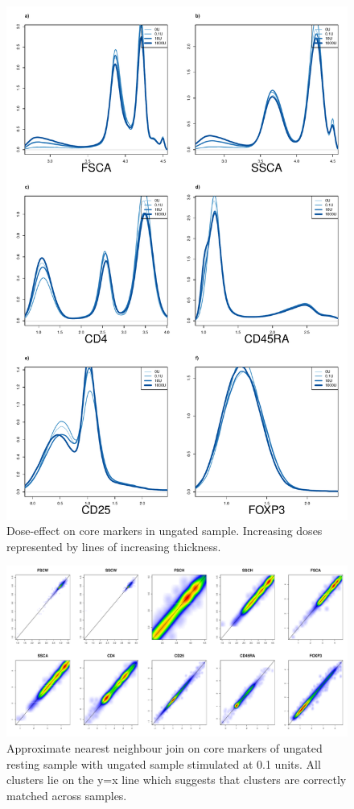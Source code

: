 \hspace{-2cm}
\begin{figure}[h]
\centering
\includegraphics[scale=.3]{IL2/figures/dose-effect.pdf}
{Dose-effect on core markers in ungated sample.}
{
Increasing doses represented by lines of increasing thickness.
}
\end{figure}

\hspace{-2cm}
\begin{figure}[h]
\centering
\includegraphics[scale=.3]{IL2/figures/ann-join-0U-01U.pdf}
{Approximate nearest neighbour join on core markers of ungated resting sample with ungated sample stimulated at 0.1 units. }
{
All clusters lie on the y=x line which suggests that clusters are correctly matched across samples.
}
\end{figure}


